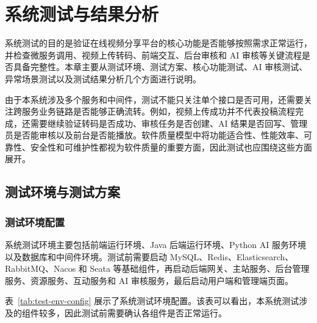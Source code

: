 
\chapter{系统测试与结果分析}
\label{chap:system-test-analysis}

系统测试的目的是验证在线视频分享平台的核心功能是否能够按照需求正常运行，并检查微服务调用、视频上传转码、前端交互、后台审核和 AI 审核等关键流程是否具备完整性。本章主要从测试环境、测试方案、核心功能测试、AI 审核测试、异常场景测试以及测试结果分析几个方面进行说明。

由于本系统涉及多个服务和中间件，测试不能只关注单个接口是否可用，还需要关注跨服务业务链路是否能够正确流转。例如，视频上传成功并不代表投稿流程完成，还需要继续验证转码是否成功、审核任务是否创建、AI 结果是否回写、管理员是否能审核以及前台是否能播放。软件质量模型中将功能适合性、性能效率、可靠性、安全性和可维护性都视为软件质量的重要方面，因此测试也应围绕这些方面展开\cite{iso25010}。

\section{测试环境与测试方案}
\label{sec:test-env-plan}

\subsection{测试环境配置}
\label{subsec:test-env-config}

系统测试环境主要包括前端运行环境、Java 后端运行环境、Python AI 服务环境以及数据库和中间件环境。测试前需要启动 MySQL、Redis、Elasticsearch、RabbitMQ、Nacos 和 Seata 等基础组件，再启动后端网关、主站服务、后台管理服务、资源服务、互动服务和 AI 审核服务，最后启动用户端和管理端页面。

表~\ref{tab:test-env-config} 展示了系统测试环境配置。该表可以看出，本系统测试涉及的组件较多，因此测试前需要确认各组件是否正常运行。

